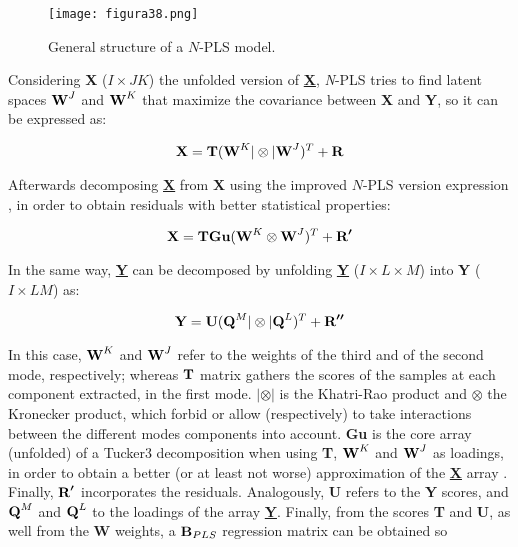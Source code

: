 \begin{figure}[hbtp]
\centering
\texttt{[image: figura38.png]}
\caption{General structure of a $N$-PLS model.}
\label{figura38}
\end{figure}


Considering \textbf{X} ($I \times JK$) the unfolded version of \textbf{\underline{X}}, \textit{N}-PLS tries to find latent spaces $\textbf{\text{W}}^{J}$ and $\textbf{\text{W}}^{K}$ that maximize the covariance between \textbf{X} and \textbf{Y}, so it can be expressed as:

\begin{equation}
\textbf{\text{X}}=\textbf{\text{T}}(\textbf{\text{W}}^{K}|\otimes{}|\textbf{\text{W}}^{J})^{T}+\textbf{\text{R}}
\label{equation01}
\end{equation}

Afterwards decomposing \textbf{\underline{X}} from \textbf{X} using the improved $N$-PLS version expression \parencite{bro2001difference}, in order to obtain residuals with better statistical properties:

\begin{equation}
\textbf{\text{X}}=\textbf{\text{T}}\textbf{\text{Gu}}(\textbf{\text{W}}^{K}\otimes{}\textbf{\text{W}}^{J})^{T}+\textbf{\text{R}}^{\boldsymbol{\prime{}}}
\label{equation02}
\end{equation}

In the same way, \textbf{\underline{Y}} can be decomposed by unfolding \textbf{\underline{Y}} ($I \times L \times M$) into \textbf{Y} ($I \times LM$) as:

\begin{equation}
\textbf{\text{Y}}=\textbf{\text{U}}(\textbf{\text{Q}}^{M}|\otimes{}|\textbf{\text{Q}}^{L})^{T}+\textbf{\text{R}}^{\boldsymbol{\prime{}\prime{}}}
\label{equation03}
\end{equation}

In this case, $\textbf{\text{W}}^{K}$ and $\textbf{\text{W}}^{J}$ refer to the weights of the third and of the second mode, respectively; whereas $\textbf{\text{T}}$ matrix gathers the scores of the samples at each component extracted, in the first mode. $|\otimes{}|$ is the Khatri-Rao product and $\otimes{}$ the Kronecker product, which forbid or allow (respectively) to take interactions between the different modes components into account. 
\textbf{Gu} is the core array (unfolded) of a Tucker3 decomposition when using \textbf{T}, $\textbf{\text{W}}^{K}$ and $\textbf{\text{W}}^{J}$ as loadings, in order to obtain a better (or at least not worse) approximation of the \textbf{\underline{X}} array \parencite{smilde2005multi}. Finally, $\textbf{\text{R}}^{\boldsymbol{\prime{}}}$ incorporates the residuals. Analogously, \textbf{U} refers to the \textbf{Y} scores, and $\textbf{\text{Q}}^{M}$ and $\textbf{\text{Q}}^{L}$ to the loadings of the array \textbf{\underline{Y}}.
Finally, from the scores \textbf{T} and \textbf{U}, as well from the \textbf{W} weights, a $\textbf{\text{B}}_{PLS}$ regression matrix can be obtained \parencite{bro1998multi} so

